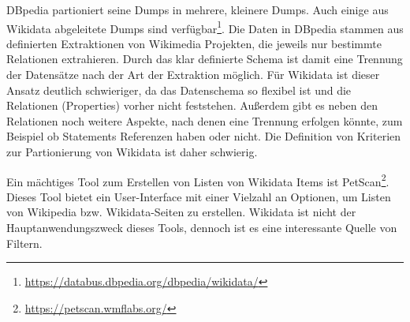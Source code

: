 DBpedia\cite{dbpedia} partioniert seine Dumps in mehrere, kleinere Dumps.
Auch einige aus Wikidata abgeleitete Dumps sind verfügbar\footnote{\url{https://databus.dbpedia.org/dbpedia/wikidata/}}.
Die Daten in DBpedia stammen aus definierten Extraktionen von Wikimedia Projekten, die jeweils nur bestimmte Relationen extrahieren.
Durch das klar definierte Schema ist damit eine Trennung der Datensätze nach der Art der Extraktion möglich.
Für Wikidata ist dieser Ansatz deutlich schwieriger, da das Datenschema so flexibel ist und die Relationen (Properties) vorher nicht feststehen.
Außerdem gibt es neben den Relationen noch weitere Aspekte, nach denen eine Trennung erfolgen könnte, zum Beispiel ob Statements Referenzen haben oder nicht.
Die Definition von Kriterien zur Partionierung von Wikidata ist daher schwierig.

Ein mächtiges Tool zum Erstellen von Listen von Wikidata Items ist PetScan\footnote{\url{https://petscan.wmflabs.org/}}.
Dieses Tool bietet ein User-Interface mit einer Vielzahl an Optionen, um Listen von Wikipedia bzw. Wikidata-Seiten zu erstellen.
Wikidata ist nicht der Hauptanwendungszweck dieses Tools, dennoch ist es eine interessante Quelle von Filtern.